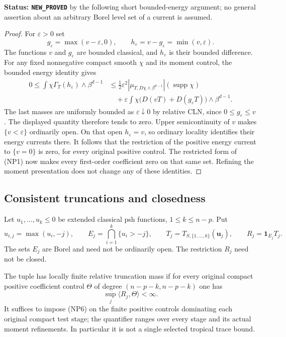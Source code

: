 \noindent\textbf{Status: \texttt{NEW\_PROVED}} by the following
short bounded-energy argument; no general assertion about an arbitrary
Borel level set of a current is assumed.

\begin{proof}
For $\varepsilon>0$ set
\[
 g_\varepsilon=\max(v-\varepsilon,0),\qquad
 h_\varepsilon=v-g_\varepsilon=\min(v,\varepsilon).
\]
The functions $v$ and $g_\varepsilon$ are bounded classical, and $h_\varepsilon$
is their bounded difference.  For any fixed nonnegative compact
smooth $\chi$ and its moment control, the bounded energy identity gives
\begin{align*}
 0\leq\int\chi\Gamma_T(h_\varepsilon)\wedge\beta^{d-1}
 &\leq \tfrac12\varepsilon^2
     |\mu_{T,D\chi\wedge\beta^{d-1}}|(\operatorname{supp}\chi)\\
 &\quad+\varepsilon\int\chi
       \bigl(D(vT)+D(g_\varepsilon T)\bigr)\wedge\beta^{d-1}.
\end{align*}
The last masses are uniformly bounded as $\varepsilon\downarrow0$
by relative CLN, since $0\leq g_\varepsilon\leq v$.  The displayed
quantity therefore tends to zero.  Upper semicontinuity of $v$
makes $\{v<\varepsilon\}$ ordinarily open.  On that open
$h_\varepsilon=v$, so ordinary locality identifies their energy
currents there.  It follows that the restriction of the positive
energy current to $\{v=0\}$ is zero, for every original positive
control.  The restricted form of (NP1) now makes every first-order
coefficient zero on that same set.  Refining the moment presentation
does not change any of these identities.
\end{proof}

\subsection{Consistent truncations and closedness}

Let $u_1,\ldots,u_k\leq0$ be extended classical psh functions,
$1\leq k\leq n-p$.  Put
\[
 u_{i,j}=\max(u_i,-j),\qquad
 E_j=\bigcap_{i=1}^k\{u_i>-j\},\qquad
 T_j=T_{S,\{1,\ldots,k\}}(\mathbf u_j),\qquad
 R_j=\mathbf1_{E_j}T_j.
 \tag{NP5}
\]
The sets $E_j$ are Borel and need not be ordinarily open.  The
restriction $R_j$ need not be closed.

\begin{definition}
\label{def:r11-finite-truncation-mass}
The tuple has locally finite relative truncation mass if for every
original compact positive coefficient control $\Theta$ of degree
$(n-p-k,n-p-k)$ one has
\[
                         \sup_j\langle R_j,\Theta\rangle<\infty.
 \tag{NP6}
\]
It suffices to impose (NP6) on the finite positive controls dominating
each original compact test stage; the quantifier ranges over every
stage and its actual moment refinements.  In particular it is not a
single selected tropical trace bound.
\end{definition}

